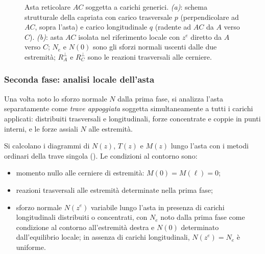 \begin{figure}[htbp]
{
	}%
	\caption{Asta reticolare $AC$ soggetta a carichi generici.
		\emph{(a)}: schema strutturale della capriata con
		carico trasversale $p$ (perpendicolare ad $AC$,
		sopra l'asta) e carico longitudinale $q$
		(radente ad $AC$ da $A$ verso $C$).
		\emph{(b)}: asta $AC$ isolata nel riferimento locale
		con $z^e$ diretto da $A$ verso $C$;
		$N_e$ e $N(0)$ sono gli sforzi normali uscenti
		dalle due estremità; $R_A^\perp$ e $R_C^\perp$
		sono le reazioni trasversali alle cerniere.}
	\label{fig:asta_caricata}
\end{figure}

\subsubsection{Seconda fase: analisi locale dell'asta}
\label{subsec:fase2_locale}

Una volta noto lo sforzo normale $N$ dalla prima
fase, si analizza l'asta separatamente come
\emph{trave appoggiata} soggetta simultaneamente
a tutti i carichi applicati: distribuiti trasversali
e longitudinali, forze concentrate e coppie in
punti interni, e le forze assiali $N$ alle estremità.

Si calcolano i diagrammi di $N(z)$, $T(z)$ e $M(z)$
lungo l'asta con i metodi ordinari della trave
singola (). Le condizioni
al contorno sono:
\begin{itemize}[noitemsep]
	\item momento nullo alle cerniere di estremità:
	$M(0) = M(\ell) = 0$;
	\item reazioni trasversali alle estremità
	determinate nella prima fase;
	\item sforzo normale $N(z^e)$ variabile lungo l'asta
	in presenza di carichi longitudinali distribuiti
	o concentrati, con $N_e$ noto dalla prima fase
	come condizione al contorno all'estremità destra
	e $N(0)$ determinato dall'equilibrio locale;
	in assenza di carichi longitudinali, $N(z^e) = N_e$
	è uniforme.
\end{itemize}


